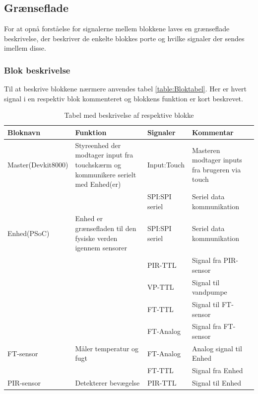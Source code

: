\begin{table}[H] %
\subsection{Grænseflade}
For at opnå forståelse for signalerne mellem blokkene laves en grænseflade beskrivelse, der beskriver de enkelte blokkes porte og hvilke signaler der sendes imellem disse.

\subsubsection{Blok beskrivelse}
Til at beskrive blokkene nærmere anvendes tabel \ref{table:Bloktabel}. Her er hvert signal i en respektiv blok kommenteret og blokkens funktion er kort beskrevet. 

\caption{Tabel med beskrivelse af respektive blokke}
\begin{small}
\begin{tabular}{|p{}|p{}|p{}|p{}|}
\hline
\textbf{Bloknavn} & \textbf{Funktion} & \textbf{Signaler} & \textbf{Kommentar} \\ \hline

Master(Devkit8000) & Styreenhed der modtager input fra touchskærm og kommunikere serielt med Enhed(er) & Input:Touch & Masteren modtager inputs fra brugeren via touch \\ \cline{3-4}	
& 				   & SPI:SPI seriel & Seriel data kommunikation \\ \hline

Enhed(PSoC) & Enhed er grænsefladen til den fysiske verden igennem sensorer & SPI:SPI seriel & Seriel data kommunikation \\ \cline{3-4}
& & PIR-TTL 		& Signal fra PIR-sensor	\\ \cline{3-4}
& & VP-TTL 		& Signal til vandpumpe 	\\ \cline{3-4}
& & FT-TTL 		& Signal til FT-sensor 	\\ \cline{3-4}
& & FT-Analog 	& Signal fra FT-sensor 	\\ \hline

FT-sensor & Måler temperatur og fugt & FT-Analog & Analog signal til Enhed \\ \cline{3-4}
& & FT-TTL 	& Signal fra Enhed 	\\ \hline

PIR-sensor & Detekterer bevægelse & PIR-TTL & Signal til Enhed \\ \hline


\end{tabular}
\end{small}
\end{table}
